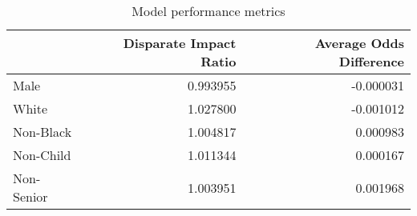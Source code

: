 \begin{table}
\centering
\caption{Model performance metrics}
\label{fairnessmetrics}
\begin{tabular}{lrr}
\toprule
{} &  Disparate Impact Ratio &  Average Odds Difference \\
\midrule
Male       &                0.993955 &                -0.000031 \\
White      &                1.027800 &                -0.001012 \\
Non-Black  &                1.004817 &                 0.000983 \\
Non-Child  &                1.011344 &                 0.000167 \\
Non-Senior &                1.003951 &                 0.001968 \\
\bottomrule
\end{tabular}
\end{table}